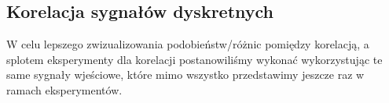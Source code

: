 \documentclass[12pt]{article}
\begin{document}


\subsection{Korelacja sygnałów dyskretnych}

W celu lepszego zwizualizowania podobieństw/różnic pomiędzy korelacją, a splotem eksperymenty dla korelacji postanowiliśmy wykonać wykorzystując te same sygnały wjeściowe, które mimo wszystko przedstawimy jeszcze raz w ramach eksperymentów.
\end{document}
